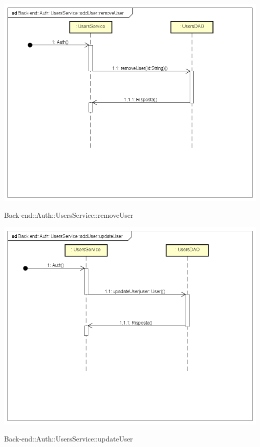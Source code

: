 \includegraphics[width=\textwidth,height=\textheight,keepaspectratio]{images/diagrams/back-end/Ufficial_Backend/Back-end__Auth__UsersService__removeUser.png} 	\caption{Back-end::Auth::UsersService::removeUser}
\includegraphics[width=\textwidth,height=\textheight,keepaspectratio]{images/diagrams/back-end/Ufficial_Backend/Back-end__Auth__UsersService__updateUser.png} 	\caption{Back-end::Auth::UsersService::updateUser}
